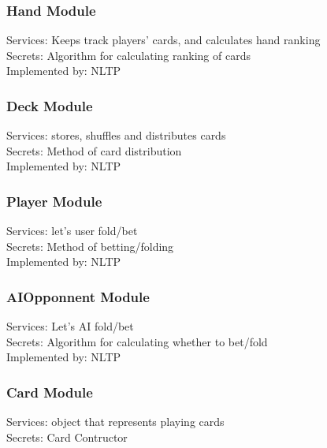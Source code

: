 \documentclass[11pt]{article}
\begin{document}
    \subsubsection{Hand Module}
    Services: Keeps track players’ cards, and calculates hand ranking\\

    Secrets: Algorithm for calculating ranking of cards \\

    Implemented by: NLTP\\

    \subsubsection{Deck Module}
    Services: stores, shuffles and distributes cards\\
    Secrets: Method of card distribution\\
    Implemented by: NLTP\\

    \subsubsection{Player Module}
    Services: let’s user fold/bet\\

    Secrets: Method of betting/folding\\

    Implemented by: NLTP\\

    \subsubsection{AIOpponnent Module}
    Services: Let’s AI fold/bet\\

    Secrets: Algorithm for calculating whether to bet/fold\\

    Implemented by: NLTP\\

    \subsubsection{Card Module}
    Services: object that represents playing cards\\

    Secrets: Card Contructor\\
\end{document}

